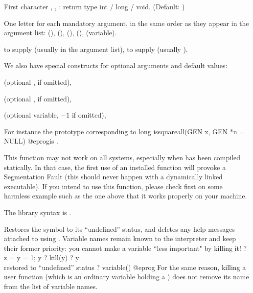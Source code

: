 \item First character , ,  : return type int / long /
void. (Default: )

\item One letter for each mandatory argument, in the same order as they appear
in the argument list:  (), \kbd{\&}
(),  (),  (), 
(variable).

 \item {} to supply  (usually  in the
 argument list),  to supply 
 (usually ).

 \noindent We also have special constructs for optional arguments and default
 values:

 \item {} (optional ,  if omitted),

 \item {} (optional ,  if omitted),

 \item {} (optional variable, $-1$ if omitted),

For instance the prototype corresponding to
\bprog
  long issquareall(GEN x, GEN *n = NULL)
@eprog\noindent is .

 This function may not work on all systems, especially
when  has been compiled statically. In that case, the first use of an
installed function will provoke a Segmentation Fault (this should never
happen with a dynamically linked executable). If you intend to use this
function, please check first on some harmless example such as the one above
that it works properly on your machine.

The library syntax is .

\label{se:kill}
Restores the symbol  to its ``undefined'' status, and deletes any
help messages attached to  using . Variable names
remain known to the interpreter and keep their former priority: you cannot
make a variable ``less important" by killing it!
\bprog
? z = y = 1; y
? kill(y)
? y            \\ restored to ``undefined'' status
? variable()
@eprog\noindent
For the same reason, killing a user function (which is an ordinary
variable holding a ) does not remove its name from the list of
variable names.

